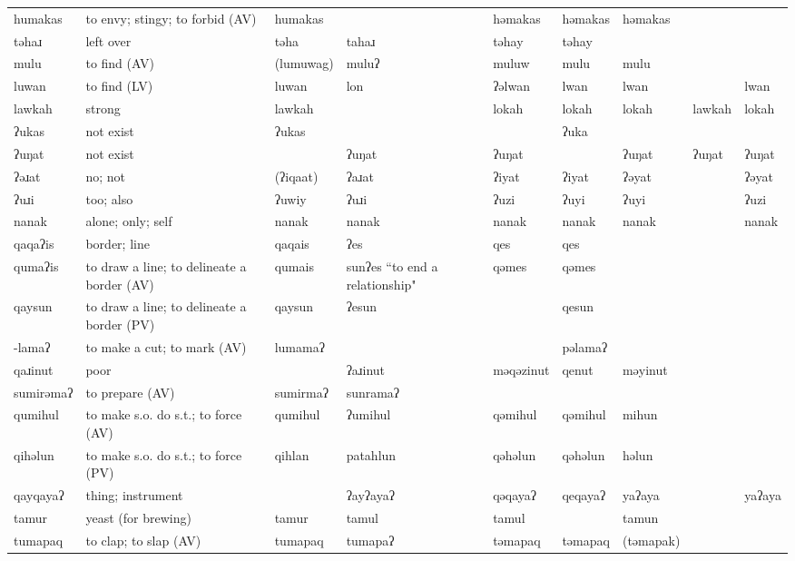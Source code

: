 \begin{landscape}
\begin{longtable}{*{9}{>{\raggedright\arraybackslash}p{}}}
\text{*}humakas & to envy; stingy; to forbid (AV) & humakas &  & həmakas & həmakas & həmakas &  & \\
\text{*}təhaɹ & left over & təha & tahaɹ & təhay & təhay &  &  & \\
\text{*}mulu & to find (AV) & (lumuwag) & muluʔ & muluw & mulu & mulu &  & \\
\text{*}luwan & to find (LV) & luwan & lon & ʔəlwan & lwan & lwan &  & lwan\\
\text{*}lawkah & strong & lawkah &  & lokah & lokah & lokah & lawkah & lokah\\
\text{*}ʔukas & not exist & ʔukas &  &  & ʔuka &  &  & \\
\text{*}ʔuŋat & not exist &  & ʔuŋat & ʔuŋat &  & ʔuŋat & ʔuŋat & ʔuŋat\\
\text{*}ʔəɹat & no; not & (ʔiqaat) & ʔaɹat & ʔiyat & ʔiyat & ʔəyat &  & ʔəyat\\
\text{*}ʔuɹi & too; also & ʔuwiy & ʔuɹi & ʔuzi & ʔuyi & ʔuyi &  & ʔuzi\\
\text{*}nanak & alone; only; self & nanak & nanak & nanak & nanak & nanak &  & nanak\\
\text{*}qaqaʔis & border; line & qaqais & ʔes & qes & qes &  &  & \\
\text{*}qumaʔis & to draw a line; to delineate a border (AV) & qumais & sunʔes ``to end a relationship" & qəmes & qəmes &  &  & \\
\text{*}qaysun & to draw a line; to delineate a border (PV) & qaysun & ʔesun &  & qesun &  &  & \\
\text{*}-lamaʔ & to make a cut; to mark (AV) & lumamaʔ &  &  & pəlamaʔ &  &  & \\
\text{*}qaɹinut & poor &  & ʔaɹinut & məqəzinut & qenut & məyinut &  & \\
\text{*}sumirəmaʔ & to prepare (AV) & sumirmaʔ & sunramaʔ &  &  &  &  & \\
\text{*}qumihul & to make s.o. do s.t.; to force (AV) & qumihul & ʔumihul & qəmihul & qəmihul & mihun &  & \\
\text{*}qihəlun & to make s.o. do s.t.; to force (PV) & qihlan & patahlun & qəhəlun & qəhəlun & həlun &  & \\
\text{*}qayqayaʔ & thing; instrument &  & ʔayʔayaʔ & qəqayaʔ & qeqayaʔ & yaʔaya &  & yaʔaya\\
\text{*}tamur & yeast (for brewing) & tamur & tamul & tamul &  & tamun &  & \\
\text{*}tumapaq & to clap; to slap (AV) & tumapaq & tumapaʔ & təmapaq & təmapaq & (təmapak) &  & \\

\end{longtable}
\end{landscape}
